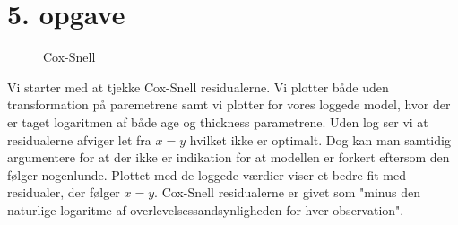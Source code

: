 \chapter{5. opgave}
\begin{figure}[h]
    \centering
    \hfill
    \hfill
    \caption{Cox-Snell}
    \label{fig:enter-label}
\end{figure}
Vi starter med at tjekke Cox-Snell residualerne. Vi plotter både uden transformation på paremetrene samt vi plotter for vores loggede model, hvor der er taget logaritmen af både age og thickness parametrene. Uden log ser vi at residualerne afviger let fra $x=y$ hvilket ikke er optimalt. Dog kan man samtidig argumentere for at der ikke er indikation for at modellen er forkert eftersom den følger nogenlunde. Plottet med de loggede værdier viser et bedre fit med residualer, der følger $x=y$. Cox-Snell residualerne er givet som "minus den naturlige logaritme af overlevelsessandsynligheden for hver observation".\\\\
